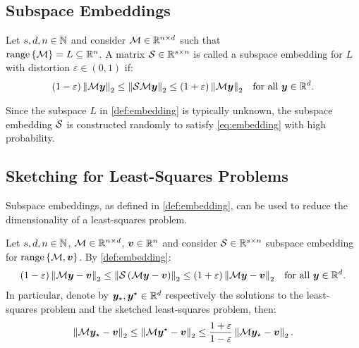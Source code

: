 \subsection{Subspace Embeddings}

\begin{definition} \label{def:embedding}
    Let $s, d, n \in \mathbb{N}$ and consider $\mathcal{M} \in \mathbb{R}^{n \times d}$ such that \\ $\operatorname*{range}\left\{\mathcal{M}\right\} = L \subseteq \mathbb{R}^{n}$. A matrix $\mathcal{S} \in \mathbb{R}^{s \times n}$ is called a subspace embedding for $L$ with distortion $\varepsilon \in \left(0, 1\right)$ if:
    \begin{align}
        \left( 1 - \varepsilon \right) \left\lVert \mathcal{M} \bm{y} \right\rVert_2 \leq \left\lVert \mathcal{S} \mathcal{M} \bm{y} \right\rVert_2 &\leq \left( 1 + \varepsilon \right) \left\lVert \mathcal{M} \bm{y} \right\rVert_2 &\text{for all } \bm{y} \in \mathbb{R}^{d}. \label{eq:embedding}
    \end{align}
\end{definition}

Since the subspace $L$ in \cref{def:embedding} is typically unknown, the subspace embedding $\mathcal{S}$ is constructed randomly to satisfy \cref{eq:embedding} with high probability.

\subsection{Sketching for Least-Squares Problems}

Subspace embeddings, as defined in \cref{def:embedding}, can be used to reduce the dimensionality of a least-squares problem.

\begin{Fact} \label{fact:least_squares}
    Let $s, d, n \in \mathbb{N}$, $\mathcal{M} \in \mathbb{R}^{n \times d}$, $\bm{v} \in \mathbb{R}^{n}$ and consider $\mathcal{S} \in \mathbb{R}^{s \times n}$ subspace embedding for $\operatorname*{range}\left\{\mathcal{M}, \bm{v}\right\}$. By \cref{def:embedding}:
    \begin{align}
        \left( 1 - \varepsilon \right) \left\lVert \mathcal{M} \bm{y} - \bm{v} \right\rVert_2 \leq \left\lVert \mathcal{S} \left( \mathcal{M} \bm{y} - \bm{v} \right) \right\rVert_2 &\leq \left( 1 + \varepsilon \right) \left\lVert \mathcal{M} \bm{y} - \bm{v} \right\rVert_2 &\text{for all } \bm{y} \in \mathbb{R}^{d}. \label{eq:sketched_least_squares_1}
    \end{align}
    In particular, denote by $\bm{y}_{\star}, \bm{y}^{\star} \in \mathbb{R}^{d}$ respectively the solutions to the least-squares problem and the sketched least-squares problem, then:
    \begin{align}
        \left\lVert \mathcal{M} \bm{y}_{\star} - \bm{v} \right\rVert_2 \leq \left\lVert \mathcal{M} \bm{y}^{\star} - \bm{v} \right\rVert_2 \leq \frac{1 + \varepsilon}{1 - \varepsilon} \left\lVert \mathcal{M} \bm{y}_{\star} - \bm{v} \right\rVert_2. \label{eq:sketched_least_squares_2}
    \end{align}
\end{Fact}


